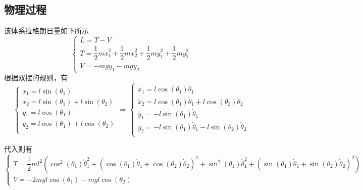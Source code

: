 \documentclass[UTF8]{ctexart}
\begin{document}
		\subsection{物理过程}
			该体系拉格朗日量如下所示
			\begin{equation}
				\begin{cases}
					L = T - V                                                                                                                         \\
					T = \dfrac{1}{2} m \dot{x}_{1}^{2} + \dfrac{1}{2} m \dot{x}_{2}^{2} + \dfrac{1}{2} m \dot{y}_{1}^{2} + \dfrac{1}{2} m \dot{y}_{2}^{2} \\
					V = -m g y_{1} - m g y_{2}
				\end{cases}
			\end{equation}
			根据双摆的规则，有
			\begin{equation}
				\begin{cases}
					x_{1} = l \sin(\theta_1)                         \\
					x_{2} = l \sin(\theta_1) + l \sin(\theta_2)      \\
					y_{1} = l \cos(\theta_1)                         \\
					y_{2} = l \cos(\theta_1) + l \cos(\theta_2)      \\
				\end{cases}
				\Longrightarrow
				\begin{cases}
					\dot{x}_{1} =  l \cos(\theta_1) \dot{\theta}_1                                        \\
					\dot{x}_{2} =  l \cos(\theta_1) \dot{\theta}_1 + l \cos(\theta_2) \dot{\theta}_2      \\
					\dot{y}_{1} = -l \sin(\theta_1) \dot{\theta}_1                                        \\
					\dot{y}_{2} = -l \sin(\theta_1) \dot{\theta}_1 - l \sin(\theta_2) \dot{\theta}_2      \\
				\end{cases}
			\end{equation}

			代入则有
			\begin{equation}
				\begin{cases}
					T = \dfrac{1}{2} m l^2 \left(\cos^2(\theta_1) \dot{\theta}_{1}^{2} + \left(\cos(\theta_1) \dot{\theta}_1 + \cos(\theta_2) \dot{\theta}_2\right)^{2} + \sin^2(\theta_1) \dot{\theta}_{1}^{2} + \left(\sin(\theta_1) \dot{\theta}_1 + \sin(\theta_2) \dot{\theta}_2\right)^2\right) \\
					V = -2 m g l \cos(\theta_1) - m g l\cos(\theta_2)
				\end{cases}
			\end{equation}
\end{document}
